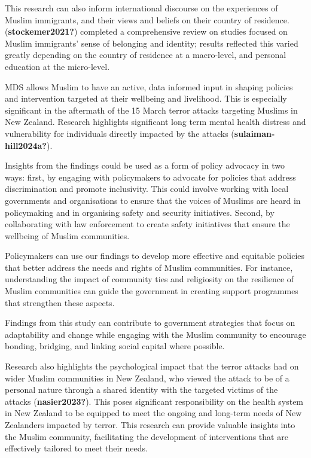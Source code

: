 \documentclass[
]{interact}
\begin{document}
This research can also inform international discourse on the experiences
of Muslim immigrants, and their views and beliefs on their country of
residence. (\textbf{stockemer2021?}) completed a comprehensive review on
studies focused on Muslim immigrants' sense of belonging and identity;
results reflected this varied greatly depending on the country of
residence at a macro-level, and personal education at the micro-level.

MDS allows Muslim to have an active, data informed input in shaping
policies and intervention targeted at their wellbeing and livelihood.
This is especially significant in the aftermath of the 15 March terror
attacks targeting Muslims in New Zealand. Research highlights
significant long term mental health distress and vulnerability for
individuals directly impacted by the attacks
(\textbf{sulaiman-hill2024a?}).

Insights from the findings could be used as a form of policy advocacy in
two ways: first, by engaging with policymakers to advocate for policies
that address discrimination and promote inclusivity. This could involve
working with local governments and organisations to ensure that the
voices of Muslims are heard in policymaking and in organising safety and
security initiatives. Second, by collaborating with law enforcement to
create safety initiatives that ensure the wellbeing of Muslim
communities.

Policymakers can use our findings to develop more effective and
equitable policies that better address the needs and rights of Muslim
communities. For instance, understanding the impact of community ties
and religiosity on the resilience of Muslim communities can guide the
government in creating support programmes that strengthen these aspects.

Findings from this study can contribute to government strategies that
focus on adaptability and change while engaging with the Muslim
community to encourage bonding, bridging, and linking social capital
where possible.

Research also highlights the psychological impact that the terror
attacks had on wider Muslim communities in New Zealand, who viewed the
attack to be of a personal nature through a shared identity with the
targeted victims of the attacks (\textbf{nasier2023?}). This poses
significant responsibility on the health system in New Zealand to be
equipped to meet the ongoing and long-term needs of New Zealanders
impacted by terror. This research can provide valuable insights into the
Muslim community, facilitating the development of interventions that are
effectively tailored to meet their needs.
\end{document}
